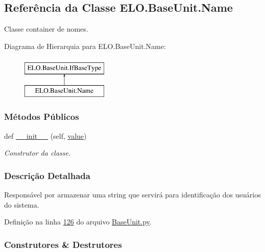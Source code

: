 \hypertarget{classELO_1_1BaseUnit_1_1Name}{}\subsection{Referência da Classe E\+L\+O.\+Base\+Unit.\+Name}
\label{classELO_1_1BaseUnit_1_1Name}


Classe container de nomes.  


Diagrama de Hierarquia para E\+L\+O.\+Base\+Unit.\+Name\+:\begin{figure}[H]
\begin{center}
\leavevmode
\includegraphics[height=2.000000cm]{d9/dff/classELO_1_1BaseUnit_1_1Name}
\end{center}
\end{figure}
\subsubsection*{Métodos Públicos}
\begin{DoxyCompactItemize}
\item 
def \hyperlink{classELO_1_1BaseUnit_1_1Name_aaf1d0873e339b23b588a539d0aa6acaf}{\+\_\+\+\_\+init\+\_\+\+\_\+} (self, \hyperlink{classELO_1_1BaseUnit_1_1IfBaseType_a2534c3548a8e5991dde0a64b4f0b542b}{value})
\begin{DoxyCompactList}\small\item\em Construtor da classe. \end{DoxyCompactList}\end{DoxyCompactItemize}


\subsubsection{Descrição Detalhada}
Responsável por armazenar uma string que servirá para identificação dos usuários do sistema. 

Definição na linha \hyperlink{BaseUnit_8py_source_l00126}{126} do arquivo \hyperlink{BaseUnit_8py_source}{Base\+Unit.\+py}.



\subsubsection{Construtores \& Destrutores}
\hypertarget{classELO_1_1BaseUnit_1_1Name_aaf1d0873e339b23b588a539d0aa6acaf}{}
